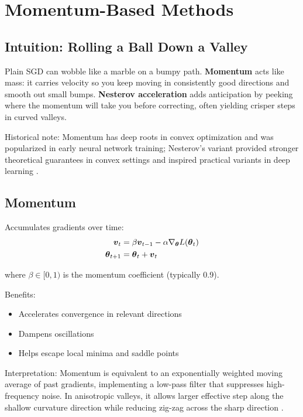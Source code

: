 
\section{Momentum-Based Methods}
\label{sec:momentum}

\subsection{Intuition: Rolling a Ball Down a Valley}

Plain SGD can wobble like a marble on a bumpy path. \textbf{Momentum} acts like mass: it carries velocity so you keep moving in consistently good directions and smooth out small bumps. \textbf{Nesterov acceleration} adds anticipation by peeking where the momentum will take you before correcting, often yielding crisper steps in curved valleys.

Historical note: Momentum has deep roots in convex optimization and was popularized in early neural network training; Nesterov's variant provided stronger theoretical guarantees in convex settings and inspired practical variants in deep learning \cite{Polyak1964,Nesterov1983,GoodfellowEtAl2016,Bishop2006}.

\subsection{Momentum}

Accumulates gradients over time:
\begin{align}
\boldsymbol{v}_t &= \beta \boldsymbol{v}_{t-1} - \alpha \nabla_{\boldsymbol{\theta}} L(\boldsymbol{\theta}_t) \\
\boldsymbol{\theta}_{t+1} &= \boldsymbol{\theta}_t + \boldsymbol{v}_t
\end{align}

where $\beta \in [0, 1)$ is the momentum coefficient (typically 0.9).

Benefits:
\begin{itemize}
    \item Accelerates convergence in relevant directions
    \item Dampens oscillations
    \item Helps escape local minima and saddle points
\end{itemize}

Interpretation: Momentum is equivalent to an exponentially weighted moving average of past gradients, implementing a low-pass filter that suppresses high-frequency noise. In anisotropic valleys, it allows larger effective step along the shallow curvature direction while reducing zig-zag across the sharp direction \cite{Polyak1964,WebOptimizationDLBook,D2LChapterOptimization}.

